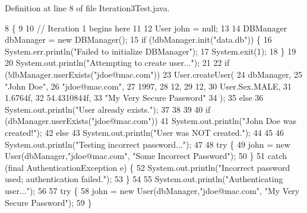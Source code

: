 Definition at line 8 of file Iteration3\+Test.\+java.


\begin{DoxyCode}
8                                            \{
9 
10         \textcolor{comment}{// Iteration 1 begins here}
11 
12         User john = null;
13 
14         DBManager dbManager = \textcolor{keyword}{new} DBManager();
15         \textcolor{keywordflow}{if} (!dbManager.init(\textcolor{stringliteral}{"data.db"})) \{
16             System.err.println(\textcolor{stringliteral}{"Failed to initialize DBManager"});
17             System.exit(1);
18         \}
19 
20         System.out.println(\textcolor{stringliteral}{"Attempting to create user..."});
21 
22         \textcolor{keywordflow}{if} (!dbManager.userExists(\textcolor{stringliteral}{"jdoe@mac.com"}))
23             User.createUser(
24                     dbManager,
25                     \textcolor{stringliteral}{"John Doe"},
26                     \textcolor{stringliteral}{"jdoe@mac.com"},
27                     1997,
28                     12,
29                     12,
30                     User.Sex.MALE,
31                     1.6764f,
32                     54.4310844f,
33                     \textcolor{stringliteral}{"My Very Secure Password"}
34             );
35         \textcolor{keywordflow}{else}
36             System.out.println(\textcolor{stringliteral}{"User already exists."});
37 
38 
39 
40         \textcolor{keywordflow}{if} (dbManager.userExists(\textcolor{stringliteral}{"jdoe@mac.com"}))
41             System.out.println(\textcolor{stringliteral}{"John Doe was created!"});
42         \textcolor{keywordflow}{else}
43             System.out.println(\textcolor{stringliteral}{"User was NOT created."});
44 
45 
46         System.out.println(\textcolor{stringliteral}{"Testing incorrect password..."});
47 
48         \textcolor{keywordflow}{try} \{
49             john = \textcolor{keyword}{new} User(dbManager,\textcolor{stringliteral}{"jdoe@mac.com"}, \textcolor{stringliteral}{"Some Incorrect Password"});
50         \}
51         \textcolor{keywordflow}{catch} (\textcolor{keyword}{final} AuthenticationException e) \{
52             System.out.println(\textcolor{stringliteral}{"Incorrect password used; authentication failed."});
53         \}
54 
55         System.out.println(\textcolor{stringliteral}{"Authenticating user..."});
56 
57         \textcolor{keywordflow}{try} \{
58             john = \textcolor{keyword}{new} User(dbManager,\textcolor{stringliteral}{"jdoe@mac.com"}, \textcolor{stringliteral}{"My Very Secure Password"});
59         \}

\end{DoxyCode}
